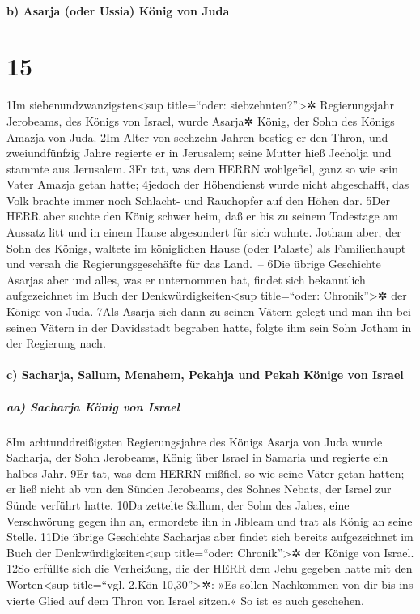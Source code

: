 \hypertarget{b-asarja-oder-ussia-kuxf6nig-von-juda}{%
\paragraph{b) Asarja (oder Ussia) König von
Juda}\label{b-asarja-oder-ussia-kuxf6nig-von-juda}}

\hypertarget{section-14}{%
\section{15}\label{section-14}}

1Im siebenundzwanzigsten\textless sup title=``oder:
siebzehnten?''\textgreater✲ Regierungsjahr Jerobeams, des Königs von
Israel, wurde Asarja✲ König, der Sohn des Königs Amazja von Juda. 2Im
Alter von sechzehn Jahren bestieg er den Thron, und zweiundfünfzig Jahre
regierte er in Jerusalem; seine Mutter hieß Jecholja und stammte aus
Jerusalem. 3Er tat, was dem HERRN wohlgefiel, ganz so wie sein Vater
Amazja getan hatte; 4jedoch der Höhendienst wurde nicht abgeschafft, das
Volk brachte immer noch Schlacht- und Rauchopfer auf den Höhen dar. 5Der
HERR aber suchte den König schwer heim, daß er bis zu seinem Todestage
am Aussatz litt und in einem Hause abgesondert für sich wohnte. Jotham
aber, der Sohn des Königs, waltete im königlichen Hause (oder Palaste)
als Familienhaupt und versah die Regierungsgeschäfte für das Land.~--
6Die übrige Geschichte Asarjas aber und alles, was er unternommen hat,
findet sich bekanntlich aufgezeichnet im Buch der
Denkwürdigkeiten\textless sup title=``oder: Chronik''\textgreater✲ der
Könige von Juda. 7Als Asarja sich dann zu seinen Vätern gelegt und man
ihn bei seinen Vätern in der Davidsstadt begraben hatte, folgte ihm sein
Sohn Jotham in der Regierung nach.

\hypertarget{c-sacharja-sallum-menahem-pekahja-und-pekah-kuxf6nige-von-israel}{%
\paragraph{c) Sacharja, Sallum, Menahem, Pekahja und Pekah Könige von
Israel}\label{c-sacharja-sallum-menahem-pekahja-und-pekah-kuxf6nige-von-israel}}

\hypertarget{aa-sacharja-kuxf6nig-von-israel}{%
\subparagraph{aa) Sacharja König von
Israel}\label{aa-sacharja-kuxf6nig-von-israel}}

8Im achtunddreißigsten Regierungsjahre des Königs Asarja von Juda wurde
Sacharja, der Sohn Jerobeams, König über Israel in Samaria und regierte
ein halbes Jahr. 9Er tat, was dem HERRN mißfiel, so wie seine Väter
getan hatten; er ließ nicht ab von den Sünden Jerobeams, des Sohnes
Nebats, der Israel zur Sünde verführt hatte. 10Da zettelte Sallum, der
Sohn des Jabes, eine Verschwörung gegen ihn an, ermordete ihn in Jibleam
und trat als König an seine Stelle. 11Die übrige Geschichte Sacharjas
aber findet sich bereits aufgezeichnet im Buch der
Denkwürdigkeiten\textless sup title=``oder: Chronik''\textgreater✲ der
Könige von Israel. 12So erfüllte sich die Verheißung, die der HERR dem
Jehu gegeben hatte mit den Worten\textless sup title=``vgl. 2.Kön
10,30''\textgreater✲: »Es sollen Nachkommen von dir bis ins vierte Glied
auf dem Thron von Israel sitzen.« So ist es auch geschehen.

